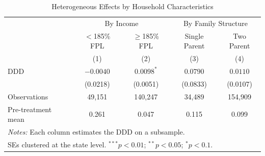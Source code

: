 \begin{table}[t]
\centering
\caption{Heterogeneous Effects by Household Characteristics}
\label{tab:hetero}
\begin{tabular}{lcccc}
\hline\hline
 & \multicolumn{2}{c}{By Income} & \multicolumn{2}{c}{By Family Structure} \\
 & $<$185\% FPL & $\geq$185\% FPL & Single Parent & Two Parent \\
 & (1) & (2) & (3) & (4) \\
\hline
DDD & $-0.0040$ & $0.0098^{*}$ & $0.0790$ & $0.0110$ \\
 & (0.0218) & (0.0051) & (0.0833) & (0.0107) \\
\addlinespace
Observations & 49,151 & 140,247 & 34,489 & 154,909 \\
Pre-treatment mean & 0.261 & 0.047 & 0.115 & 0.099 \\
\hline
\multicolumn{5}{l}{\footnotesize \textit{Notes:} Each column estimates the DDD on a subsample.} \\
\multicolumn{5}{l}{\footnotesize SEs clustered at the state level. $^{***}p<0.01$; $^{**}p<0.05$; $^{*}p<0.1$.} \\
\end{tabular}
\end{table}
